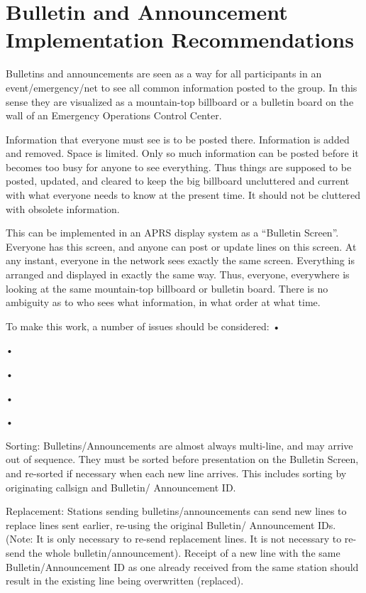 {{{{{{{\section{Bulletin and Announcement Implementation Recommendations}


Bulletins and announcements are seen as a way for all participants in an
event/emergency/net to see all common information posted to the group. In
this sense they are visualized as a mountain-top billboard or a bulletin board
on the wall of an Emergency Operations Control Center.

Information that everyone must see is to be posted there. Information is
added and removed. Space is limited. Only so much information can be
posted before it becomes too busy for anyone to see everything. Thus things
are supposed to be posted, updated, and cleared to keep the big billboard
uncluttered and current with what everyone needs to know at the present
time. It should not be cluttered with obsolete information.

This can be implemented in an APRS display system as a “Bulletin Screen”.
Everyone has this screen, and anyone can post or update lines on this screen.
At any instant, everyone in the network sees exactly the same screen.
Everything is arranged and displayed in exactly the same way. Thus,
everyone, everywhere is looking at the same mountain-top billboard or
bulletin board. There is no ambiguity as to who sees what information, in
what order at what time.

To make this work, a number of issues should be considered:
•

•

•

•

•

Sorting: Bulletins/Announcements are almost always multi-line, and
may arrive out of sequence. They must be sorted before presentation on
the Bulletin Screen, and re-sorted if necessary when each new line
arrives. This includes sorting by originating callsign and Bulletin/
Announcement ID.

Replacement: Stations sending bulletins/announcements can send new
lines to replace lines sent earlier, re-using the original Bulletin/
Announcement IDs. (Note: It is only necessary to re-send replacement
lines. It is not necessary to re-send the whole bulletin/announcement).
Receipt of a new line with the same Bulletin/Announcement ID as one
already received from the same station should result in the existing line
being overwritten (replaced).

}}}}}}}
